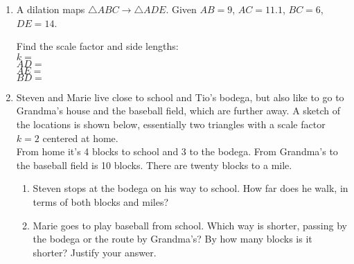 \begin{enumerate}
\newpage
\item A dilation maps $\triangle ABC \rightarrow \triangle ADE$. Given $AB=9$, $AC=11.1$, $BC=6$, $DE=14$. 
\begin{multicols}{2}
  Find the scale factor and side lengths:\\[0.5cm]
  $k=$\\[1cm]
  $AD=$\\[1cm]
  $AE=$\\[1cm]
  $BD=$\\
  \begin{flushright}
  \end{flushright}
\end{multicols}\vspace{0.25cm}

\item Steven and Marie live close to school and Tio's bodega, but also like to go to Grandma's house and the baseball field, which are further away. A sketch of the locations is shown below, essentially two triangles with a scale factor $k=2$ centered at home.\\[0.25cm]
From home it's 4 blocks to school and 3 to the bodega. From Grandma's to the baseball field is 10 blocks. There are twenty blocks to a mile.
\begin{enumerate}
  \item Steven stops at the bodega on his way to school. How far does he walk, in terms of both blocks and miles?
\begin{flushright}
\end{flushright} 
  \item Marie goes to play baseball from school. Which way is shorter, passing by the bodega or the route by Grandma's? By how many blocks is it shorter? Justify your answer.
\end{enumerate}


\end{enumerate}
